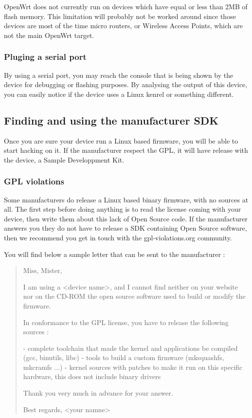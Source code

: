 OpenWrt does not currently run on devices which have equal or less than 2MB of flash memory. This limitation will probably not be worked around since those devices are most of the time micro routers, or Wireless Access Points, which are not the main OpenWrt target.

\subsubsection{Pluging a serial port}

By using a serial port, you may reach the console that is being shown by the device for debugging or flashing purposes. By analysing the output of this device, you can easily notice if the device uses a Linux kenrel or something different.

\subsection{Finding and using the manufacturer SDK}

Once you are sure your device run a Linux based firmware, you will be able to start hacking on it. If the manufacturer respect the GPL, it will have release with the device, a Sample Developpment Kit.

\subsubsection{GPL violations}

Some manufacturers do release a Linux based binary firmware, with no sources at all. The first step before doing anything is to read the license coming with your device, then write them about this lack of Open Source code. If the manufacturer answers you they do not have to release a SDK containing Open Source software, then we recommend you get in touch with the gpl-violations.org community.

You will find below a sample letter that can be sent to the manufacturer :

\begin{verse}
Miss, Mister,

I am using a <device name>, and I cannot find neither on your website nor on the CD-ROM the open source software used to build or modify the firmware.

In conformance to the GPL license, you have to release the following sources :

- complete toolchain that made the kernel and applications be compiled (gcc, binutils, libc)
- tools to build a custom firmware (mksquashfs, mkcramfs ...)
- kernel sources with patches to make it run on this specific hardware, this does not include binary drivers

Thank you very much in advance for your answer.

Best regards, <your namne>
\end{verse}

